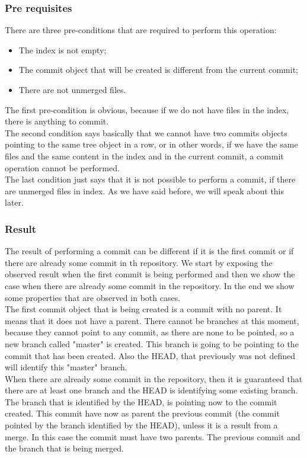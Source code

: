 \subsubsection{Pre requisites}
There are three pre-conditions that are required to perform this
operation:
\begin{itemize}
   \item The index is not empty;
   \item The commit object that will be created is different from the
   current commit;
   \item There are not unmerged files.
\end{itemize}
The first pre-condition is obvious, because if we do not have files in
the index, there is anything to commit.\\

The second condition says basically
that we cannot have two commits objects pointing to the same
tree object in a row, or in other words, if we have the same files and
the same content in the index and in the current commit, a commit
operation cannot be performed. \\

The last condition just says that it is not possible to perform a
commit, if there are unmerged files in index. As we have said before,
we will speak about this later.

\subsubsection{Result}
The result of performing a commit can be different if it is the first
commit or if there are already some commit in th repository. 
We start by exposing the observed result when the first commit is
being performed and then we show the case when there are already some
commit in the repository. In the end we show some properties that are
observed in both cases.\\

The first commit object that is being created is a commit with no
parent. It means that it does not have a parent. There cannot be branches
at this moment, because they cannot point to any commit, as there are none to be
pointed, so a new branch called "master" is created. This branch is going to be pointing to 
the commit that has been created. Also the HEAD, that previously was 
not defined will identify this "master" branch.\\

When there are already some commit in the repository, then it is
guaranteed that there are at least one branch and the HEAD is
identifying some existing branch. The branch that is identified by the
HEAD, is pointing now to the commit created. This commit have now as
parent the previous commit (the commit pointed by the branch
identified by the HEAD), unless it is a result from a merge. In this
case the commit must have two parents. The previous commit and the
branch that is being merged.\\

